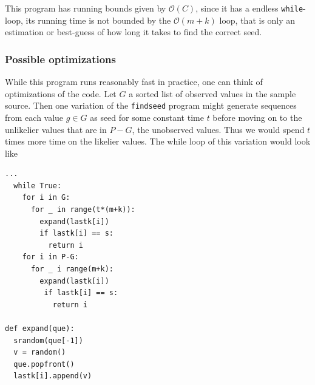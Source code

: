 \documentclass[a4paper]{article}           %
\newcommand{\tmpsection}[1]{}
\let\tmpsection=\section
\renewcommand{\section}[2]{

    \ifthenelse{
      \equal{#2}{Heimildir} %
    }
    {
      \tmpsection{\sc{#1} }
      \tmpsection{\sc{#2} }
    }
    {\tmpsection{\sc{#1} } }
      

}
\begin{document}
This program has running bounds given by $\mathcal{O}(C)$, since it has a endless \texttt{while}-loop, its running time is not bounded by the $\mathcal{O}(m+k)$ loop, that is only an estimation or best-guess of how long it takes to find the correct seed. 

\subsubsection{Possible optimizations}

While this program runs reasonably fast in practice, one can think of optimizations of the code. Let $G$ a sorted list of observed values in the sample source. Then one variation of the \texttt{findseed} program might generate sequences from each value $g \in G$ as seed for some constant time $t$ before moving on to the unlikelier values that are in $P-G$, the unobserved values. Thus we would spend $t$ times more time on the likelier values. The while loop of this variation would look like

\begin{lstlisting}[caption=One possible optimization of the \texttt{findseed} program]
...
  while True:
    for i in G:
      for _ in range(t*(m+k)):
        expand(lastk[i])
        if lastk[i] == s:
          return i
    for i in P-G:
      for _ i range(m+k):
        expand(lastk[i])
         if lastk[i] == s:
           return i

def expand(que):
  srandom(que[-1])
  v = random()
  que.popfront()
  lastk[i].append(v)
\end{lstlisting}


\section{Conclusions}

{}

\end{document}
